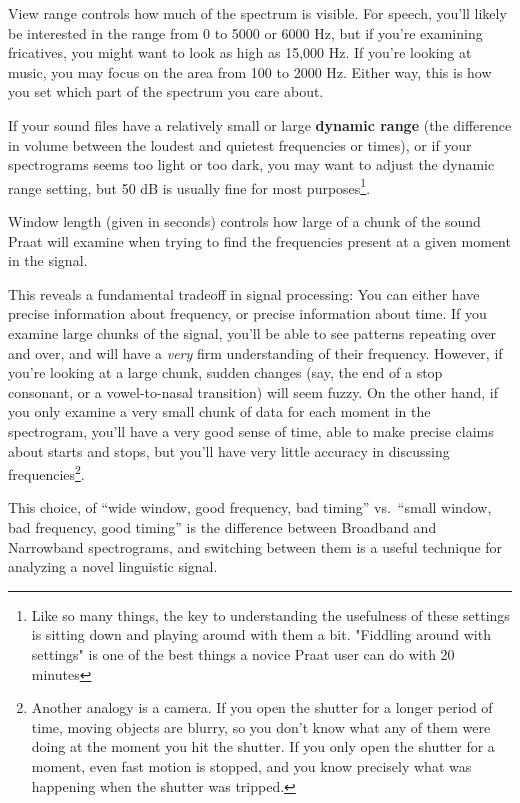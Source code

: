 View range controls how much of the spectrum is visible. For speech,
you'll likely be interested in the range from 0 to 5000 or 6000 Hz, but
if you're examining fricatives, you might want to look as high as 15,000
Hz. If you're looking at music, you may focus on the area from 100 to
2000 Hz. Either way, this is how you set which part of the spectrum you
care about.

If your sound files have a relatively small or large \textbf{dynamic
range} (the difference in volume between the loudest and quietest
frequencies or times), or if your spectrograms seems too light or too
dark, you may want to adjust the dynamic range setting, but 50 dB is
usually fine for most
purposes\footnote{Like so many things, the key to understanding the usefulness of these settings is sitting down and playing around with them a bit.  "Fiddling around with settings" is one of the best things a novice Praat user can do with 20 minutes}.

Window length (given in seconds) controls how large of a chunk of the
sound Praat will examine when trying to find the frequencies present at
a given moment in the signal.

This reveals a fundamental tradeoff in signal processing: You can either
have precise information about frequency, or precise information about
time. If you examine large chunks of the signal, you'll be able to see
patterns repeating over and over, and will have a \emph{very} firm
understanding of their frequency. However, if you're looking at a large
chunk, sudden changes (say, the end of a stop consonant, or a
vowel-to-nasal transition) will seem fuzzy. On the other hand, if you
only examine a very small chunk of data for each moment in the
spectrogram, you'll have a very good sense of time, able to make precise
claims about starts and stops, but you'll have very little accuracy in
discussing
frequencies\footnote{Another analogy is a camera.  If you open the shutter for a longer period of time, moving objects are blurry, so you don't know what any of them were doing at the moment you hit the shutter.  If you only open the shutter for a moment, even fast motion is stopped, and you know precisely what was happening when the shutter was tripped.}.

This choice, of ``wide window, good frequency, bad timing'' vs.~``small
window, bad frequency, good timing'' is the difference between Broadband
and Narrowband spectrograms, and switching between them is a useful
technique for analyzing a novel linguistic signal.

